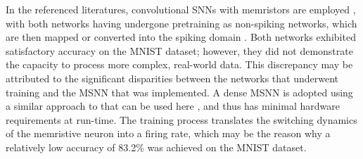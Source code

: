 

\noindent In the referenced literatures, convolutional SNNs with memristors are employed \cite{wang2018handwritten}, with both networks having undergone pretraining as non-spiking networks, which are then mapped or converted into the spiking domain \cite{wijesinghe2018all}. Both networks exhibited satisfactory accuracy on the MNIST dataset; however, they did not demonstrate the capacity to process more complex, real-world data. This discrepancy may be attributed to the significant disparities between the networks that underwent training and the MSNN that was implemented. A dense MSNN is adopted using a similar approach to that can be used here \cite{duan2020spiking}, and thus has minimal hardware requirements at run-time. The training process translates the switching dynamics of the memristive neuron into a firing rate, which may be the reason why a relatively low accuracy of 83.2\% was achieved on the MNIST dataset.\\


